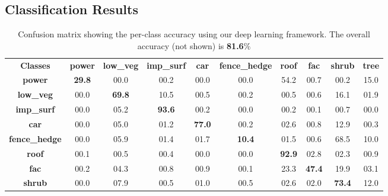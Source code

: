 \documentclass[final,3p,times,twocolumn,authoryear]{elsarticle}
\begin{document}
\subsection{Classification Results}
\label{sec:classification_results}
\begin{table*}[t]
\centering
\caption{Confusion matrix showing the per-class accuracy using our deep learning framework. The overall accuracy (not shown) is \textbf{81.6}$\%$}
\label{tab:confusion}
\begin{tabular}{c|ccccccccc}
                \textbf{Classes} & \textbf{power} & \textbf{low\_veg} & \textbf{imp\_surf} & \textbf{car}   & \textbf{fence\_hedge} & \textbf{roof}  & \textbf{fac}   & \textbf{shrub} & \textbf{tree}  \\ \cline{1-10} 
\multicolumn{1}{c|}{\textbf{power}}                 & \textbf{29.8} & 00.0             & 00.2              & 00.0          & 00.0                 & 54.2          & 00.7          & 00.2          & 15.0 \\
\multicolumn{1}{c|}{\textbf{low\_veg}}              & 00.0          & \textbf{69.8}    & 10.5              & 00.5          & 00.2                 & 00.5          & 00.6          & 16.1          & 01.9 \\
\multicolumn{1}{c|}{\textbf{imp\_surf}}             & 00.0          & 05.2             & \textbf{93.6}     & 00.2          & 00.0                 & 00.2          & 00.1          & 00.7          & 00.0 \\
\multicolumn{1}{c|}{\textbf{car}}                   & 00.0          & 05.0             & 01.2              & \textbf{77.0} & 00.2                 & 02.6          & 00.8          & 12.9          & 00.3 \\
\multicolumn{1}{c|}{\textbf{fence\_hedge}}          & 00.0          & 05.9             & 01.4              & 01.7          & \textbf{10.4}        & 01.5          & 00.6          & 68.5          & 10.0 \\
\multicolumn{1}{c|}{\textbf{roof}}                  & 00.1          & 00.5             & 00.4              & 00.0          & 00.0                 & \textbf{92.9} & 02.8          & 02.3          & 00.9 \\
\multicolumn{1}{c|}{\textbf{fac}}                   & 00.2          & 04.3             & 00.8              & 00.9          & 00.1                 & 23.3          & \textbf{47.4} & 19.9          & 03.1 \\
\multicolumn{1}{c|}{\textbf{shrub}}                 & 00.0          & 07.9             & 00.5              & 01.0          & 00.5                 & 02.6          & 02.0          & \textbf{73.4} & 12.0 \\

\end{tabular}
\end{table*}
\end{document}
